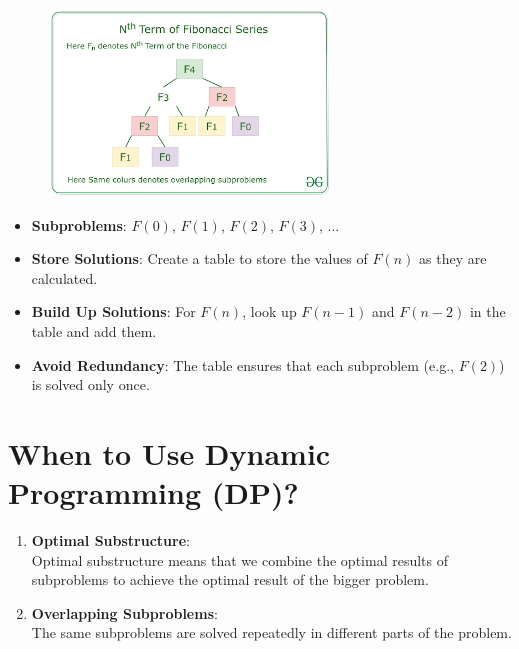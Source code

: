 \begin{table}[H]
    \begin{minipage}{0.45\linewidth}
        \begin{figure}[H]
            \includegraphics[height=5cm]{Pictures/ds-algo/nthfibonacciseriesdynamicprogramming.png}
        \end{figure}
    \end{minipage}
    \hfill
    \begin{minipage}{0.52\linewidth}
        \begin{itemize}
            \item \textbf{Subproblems}: $F(0)$, $F(1)$, $F(2)$, $F(3)$, ...
            \item \textbf{Store Solutions}: Create a table to store the values of $F(n)$ as they are calculated.
            \item \textbf{Build Up Solutions}: For $F(n)$, look up $F(n-1)$ and $F(n-2)$ in the table and add them.
            \item \textbf{Avoid Redundancy}: The table ensures that each subproblem (e.g., $F(2)$) is solved only once.
        \end{itemize}        
    \end{minipage}
\end{table}



\section{When to Use Dynamic Programming (DP)?}

\begin{enumerate}
    \item \textbf{Optimal Substructure}:\\
    Optimal substructure means that we combine the optimal results of subproblems to achieve the optimal result of the bigger problem.
    \item \textbf{Overlapping Subproblems}:\\
    The same subproblems are solved repeatedly in different parts of the problem.
\end{enumerate}


